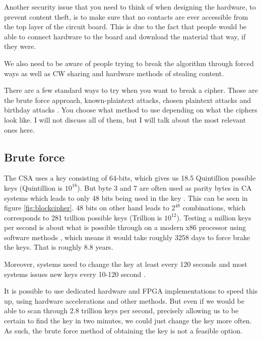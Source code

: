 Another security issue that you need to think of when designing the hardware, to 
prevent content theft, is to make sure that no contacts are ever accessible from 
the top layer of the circuit board. This is due to the fact that people would be 
able to connect hardware to the board and download the material that way, if they
were. 

We also need to be aware of people trying to break the algorithm through forced 
ways as well as CW sharing and hardware methods of stealing content.

There are a few standard ways to try when you want to break a cipher. 
Those are the brute force approach, known-plaintext attacks, chosen plaintext 
attacks and birthday attacks \citep[pp. 31-34]{Schneier:2003}. You choose what 
method to use depending on what the ciphers look like. I will not discuss all 
of them, but I will talk about the most relevant ones here.

\subsection{Brute force}
The CSA uses a key consisting of 64-bits, which gives us 18.5 Quintillion 
possible keys (Quintillion is $10^{18}$). But byte 3 and 7 are often used as 
parity bytes in CA systems which leads to only 48 bits being used in the key 
\citep{Breaking:2012}. This can be seen in figure \ref{fig:blockcipher}. 48 bits 
on other hand leads to $2^{48}$ combinations, which corresponds to 281 trillion 
possible keys (Trillion is $10^{12}$). Testing a million keys per second is about 
what is possible through on a modern x86 processor using software methods
, which means it would take roughly 
3258 days to force brake the keys. That is roughly 8.8 years.

Moreover, systems need to change the key at least every 120 seconds \citep{Simpson:2009} and most systems issues new keys every 10-120 second \citep{Wirt:2004}.

It is possible to use dedicated hardware and FPGA implementations to speed this 
up, using hardware accelerations and other methods. But even if we would be able 
to scan through 2.8 trillion keys per second, precisely allowing us to be certain
to find the key in two minutes, we could just change the key more often. As such,
the brute force method of obtaining the key is not a feasible option.

